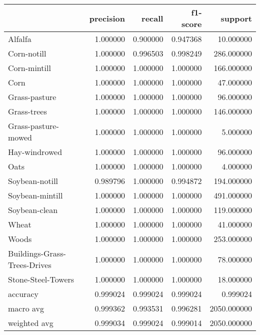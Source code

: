 \begin{tabular}{lrrrr}
\toprule
{} &  precision &    recall &  f1-score &      support \\
\midrule
Alfalfa                      &   1.000000 &  0.900000 &  0.947368 &    10.000000 \\
Corn-notill                  &   1.000000 &  0.996503 &  0.998249 &   286.000000 \\
Corn-mintill                 &   1.000000 &  1.000000 &  1.000000 &   166.000000 \\
Corn                         &   1.000000 &  1.000000 &  1.000000 &    47.000000 \\
Grass-pasture                &   1.000000 &  1.000000 &  1.000000 &    96.000000 \\
Grass-trees                  &   1.000000 &  1.000000 &  1.000000 &   146.000000 \\
Grass-pasture-mowed          &   1.000000 &  1.000000 &  1.000000 &     5.000000 \\
Hay-windrowed                &   1.000000 &  1.000000 &  1.000000 &    96.000000 \\
Oats                         &   1.000000 &  1.000000 &  1.000000 &     4.000000 \\
Soybean-notill               &   0.989796 &  1.000000 &  0.994872 &   194.000000 \\
Soybean-mintill              &   1.000000 &  1.000000 &  1.000000 &   491.000000 \\
Soybean-clean                &   1.000000 &  1.000000 &  1.000000 &   119.000000 \\
Wheat                        &   1.000000 &  1.000000 &  1.000000 &    41.000000 \\
Woods                        &   1.000000 &  1.000000 &  1.000000 &   253.000000 \\
Buildings-Grass-Trees-Drives &   1.000000 &  1.000000 &  1.000000 &    78.000000 \\
Stone-Steel-Towers           &   1.000000 &  1.000000 &  1.000000 &    18.000000 \\
accuracy                     &   0.999024 &  0.999024 &  0.999024 &     0.999024 \\
macro avg                    &   0.999362 &  0.993531 &  0.996281 &  2050.000000 \\
weighted avg                 &   0.999034 &  0.999024 &  0.999014 &  2050.000000 \\
\bottomrule
\end{tabular}
